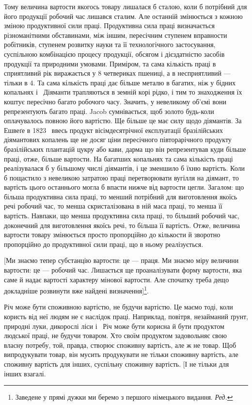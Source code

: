 
Тому величина вартости якогось товару лишалася б сталою,
коли б потрібний для його продукції робочий час лишався сталим.
Але останній змінюється з кожною зміною продуктивної
сили праці. Продуктивна сила праці визначається різноманітними
обставинами, між іншим, пересічним ступенем вправности робітників,
ступенем розвитку науки та її технологічного застосування,
суспільною комбінацією процесу продукції, обсягом і дієздатністю
засобів продукції та природними умовами. Приміром, та сама
кількість праці в сприятливий рік виражається у 8 четвериках
пшениці, а в несприятливий — тільки в 4. Та сама кількість праці
дає більше металю в багатих, ніж у бідних копальнях і~
Діяманти трапляються в земній корі рідко, і тим то знаходження
їх коштує пересічно багато робочого часу. Значить, у невеликому
об’ємі вони репрезентують багато праці. Jacob сумнівається, щоб
золото будь-коли оплачувалось повною його вартістю. Ще
більше це має силу щодо діямантів. За Ешвеґе в 1823~ ввесь
продукт вісімдесятрічної експлуатації бразілійських діямантових
копалень ще не досяг ціни пересічного півторарічного продукту
бразілійських плантацій цукру або кави, дарма що він репрезентував
куди більше праці, отже, більше вартости. На багатших
копальнях та сама кількість праці реалізувалася б у більшому
числі діямантів, і це зменшило б їхню вартість. Коли б пощастило
з невеликою затратою праці перетворювати вугілля на діямант,
то вартість цього останнього могла б впасти нижче від вартости
цегли. Загалом: що більша продуктивна сила праці, то менший
потрібний для виготовлення якоїсь речі робочий час, то менша
скристалізована в ній маса праці, то менша її вартість. Навпаки,
що менша продуктивна сила праці, то більший робочий час, доконечний
для виготовлення якоїсь речі, то більша її вартість.
Отже, величина вартости товару змінюється просто пропорційно
до кількости й зворотно пропорційно до продуктивної сили праці,
що в ньому реалізується.

[Ми знаємо тепер субстанцію вартости: це — праця. Ми знаємо
міру величини вартости: це — робочий час. Лишається ще проаналізувати
форму вартости, яка саме й надає вартості характеру
мінової вартости. Але спочатку треба дещо докладніше розвинути
вже найдені визначення]\footnote*{
Заведене у прямі дужки ми беремо з першого німецького видання. \emph{Ред.}
}.

Річ може бути споживною вартістю, не будучи вартістю. Це
маємо тоді, коли користь від неї людям не є наслідок праці. Наприклад,
повітря, незайманий ґрунт, природні луки, дикорослі
ліси і~ Річ може бути корисна й бути продуктом людської
праці, не будучи товаром. Хто своїм продуктом задовольняє свою
власну потребу, той, правда, створює споживну вартість, але ж
не товар. Щоб випродукувати товар, він мусить продукувати не
тільки споживну вартість, але споживну вартість для інших,
суспільну споживну вартість. [І не тільки для інших взагалі.
\parbreak{}  %

